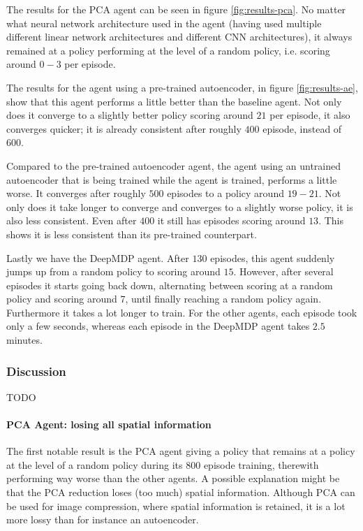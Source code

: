 The results for the PCA agent can be seen in figure \ref{fig:results-pca}. No matter what neural network architecture used in the agent (having used multiple different linear network architectures and different CNN architectures), it always remained at a policy performing at the level of a random policy, i.e. scoring around $0-3$ per episode.

The results for the agent using a pre-trained autoencoder, in figure \ref{fig:results-ae}, show that this agent performs a little better than the baseline agent. Not only does it converge to a slightly better policy scoring around $21$ per episode, it also converges quicker; it is already consistent after roughly $400$ episode, instead of $600$. 

Compared to the pre-trained autoencoder agent, the agent using an untrained autoencoder that is being trained while the agent is trained, performs a little worse. It converges after roughly $500$ episodes to a policy around $19-21$. Not only does it take longer to converge and converges to a slightly worse policy, it is also less consistent. Even after $400$ it still has episodes scoring around $13$. This shows it is less consistent than its pre-trained counterpart.

Lastly we have the DeepMDP agent. After $130$ episodes, this agent suddenly jumps up from a random policy to scoring around $15$. However, after several episodes it starts going back down, alternating between scoring at a random policy and scoring around $7$, until finally reaching a random policy again. Furthermore it takes a lot longer to train. For the other agents, each episode took only a few seconds, whereas each episode in the DeepMDP agent takes $2.5$ minutes.

\subsubsection{Discussion}\label{research-discussion-pysc2}
TODO
\paragraph{PCA Agent: losing all spatial information}
The first notable result is the PCA agent giving a policy that remains at a policy at the level of a random policy during its $800$ episode training, therewith performing way worse than the other agents. A possible explanation might be that the PCA reduction loses (too much) spatial information. Although PCA can be used for image compression, where spatial information is retained, it is a lot more lossy than for instance an autoencoder.

